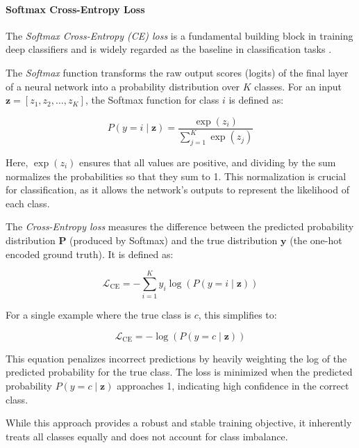 \paragraph{Softmax Cross-Entropy Loss}

The \emph{Softmax Cross-Entropy (CE) loss} is a fundamental building block in training deep classifiers and is widely regarded as the baseline in classification tasks \cite{zhang2023deep, cs231n, pytorch_crossentropy}. 

The \textit{Softmax} function transforms the raw output scores (logits) of the final layer of a neural network into a probability distribution over \( K \) classes. For an input \( \mathbf{z} = [z_1, z_2, \dots, z_K] \), the Softmax function for class \( i \) is defined as:

\begin{equation}
    P(y = i \mid \mathbf{z}) = \frac{\exp(z_i)}{\sum_{j=1}^{K} \exp(z_j)}
\end{equation}

Here, \( \exp(z_i) \) ensures that all values are positive, and dividing by the sum normalizes the probabilities so that they sum to 1. This normalization is crucial for classification, as it allows the network's outputs to represent the likelihood of each class.

The \textit{Cross-Entropy loss} measures the difference between the predicted probability distribution \( \mathbf{P} \) (produced by Softmax) and the true distribution \( \mathbf{y} \) (the one-hot encoded ground truth). It is defined as:

\begin{equation}
    \mathcal{L}_{\text{CE}} = -\sum_{i=1}^{K} y_i \log(P(y = i \mid \mathbf{z}))
\end{equation}

For a single example where the true class is \( c \), this simplifies to:

\begin{equation}
    \mathcal{L}_{\text{CE}} = -\log(P(y = c \mid \mathbf{z}))
\end{equation}

This equation penalizes incorrect predictions by heavily weighting the log of the predicted probability for the true class. The loss is minimized when the predicted probability \( P(y = c \mid \mathbf{z}) \) approaches 1, indicating high confidence in the correct class.

While this approach provides a robust and stable training objective, it inherently treats all classes equally and does not account for class imbalance.

